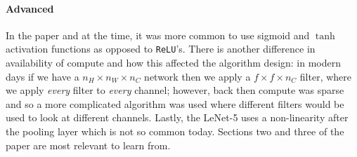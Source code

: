 \documentclass[12pt]{article}
\begin{document}
\paragraph{Advanced} In the paper and at the time, it was more common to use sigmoid and $\tanh$ activation functions as opposed to
\texttt{ReLU}'s. There is another difference in availability of compute and how this affected the algorithm design: in modern days
if we have a $n_H \times n_W \times n_C$ network then we apply a $f \times f \times n_C$ filter, where we apply \emph{every} 
filter to \emph{every} channel; however, back then compute was sparse and so a more complicated algorithm was used where different 
filters would be used to look at different channels. Lastly, the LeNet-5 uses a non-linearity after the pooling layer which is
not so common today. Sections two and three of the paper are most relevant to learn from.
\end{document}

